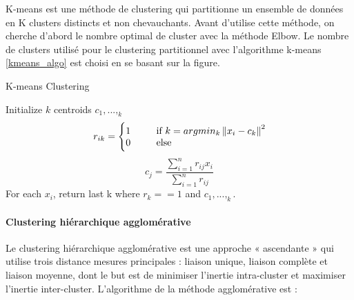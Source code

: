 K-means est une méthode de clustering qui partitionne un ensemble de données en K clusters distincts et non chevauchants. Avant d’utilise cette méthode, on cherche d’abord le nombre optimal de cluster avec la méthode Elbow. Le nombre de clusters utilisé pour le clustering partitionnel avec l’algorithme k-means \ref{kmeans_algo} est choisi en se basant sur la figure.

\begin{algorithm}[H]
	\caption{K-means Clustering}
	\label{kmeans_algo}
	\begin{algorithmic}[1]
	
		\State Initialize $k$ centroids $c_{1},...,_{k}$
			  
			\begin{equation}
				r_{ik} = \Biggl\{ 
					\begin{tabular}{@{}l@{}}
						1 \hspace{2em} if \(\displaystyle k = argmin_{k} \left\lVert x_{i} - c_{k} \right\rVert^{2}  \)  \\
						0 \hspace{2em}  else 
					\end{tabular}
			\end{equation}
			\EndFor
			 
			\begin{equation}
				c_{j} = \frac{\sum_{i=1}^{n} r_{ij}x_{i}}{\sum_{i=1}^{n} r_{ij}}
			\end{equation}
			\EndFor
		\EndWhile 
		\State \Return For each $x_{i}$, return last k where $r_{k} == 1$ and $c_{1},...,_{k}$.
	\EndProcedure
	\end{algorithmic}
\end{algorithm}

\paragraph{Clustering hiérarchique agglomérative}

Le clustering hiérarchique agglomérative est une approche « ascendante » qui utilise trois distance mesures principales : liaison unique, liaison complète et liaison moyenne, dont le but est de minimiser l’inertie intra-cluster et maximiser l’inertie inter-cluster. L’algorithme de la méthode agglomérative est :

